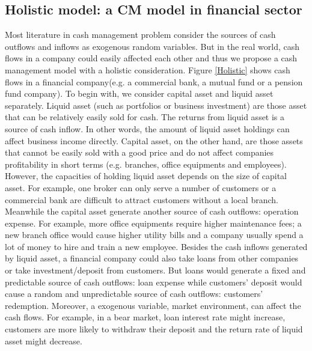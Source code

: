\documentclass[12pt]{article}
\begin{document}
\subsection{Holistic model: a CM model in financial sector}
Most literature in cash management problem consider the sources of cash outflows and inflows as exogenous random variables. But in the real world, cash flows in a company could easily affected each other and thus we propose a cash management model with a holistic consideration.
Figure \ref{Holistic} shows cash flows in a financial company(e.g. a commercial bank, a mutual fund or a pension fund company). To begin with, we consider capital asset and liquid asset separately. Liquid asset (such as portfolios or business investment) are those asset that can be relatively easily sold for cash. The returns from liquid asset is a source of cash inflow. In other words, the amount of liquid asset holdings can affect business income directly. Capital asset, on the other hand, are those assets that cannot be easily sold with a good price and do not affect companies profitability in short terms (e.g. branches, office equipments and employees). However, the capacities of holding liquid asset depends on the size of capital asset. For example, one broker can only serve a number of customers or a commercial bank are difficult to attract customers without a local branch. Meanwhile the capital asset generate another source of cash outflows: operation expense. For example, more office equipments require higher maintenance fees; a new branch office would cause higher utility bills and a company usually spend a lot of money to hire and train a new employee. Besides the cash inflows generated by liquid asset, a financial company could also take loans from other companies or take investment/deposit from customers. But loans would generate a fixed and predictable source of cash outflows: loan expense while customers' deposit would cause a random and unpredictable source of cash outflows: customers' redemption. Moreover, a exogenous variable, market environment, can affect the cash flows. For example, in a bear market, loan interest rate might increase, customers are more likely to withdraw their deposit and the return rate of liquid asset might decrease. 
\end{document}
